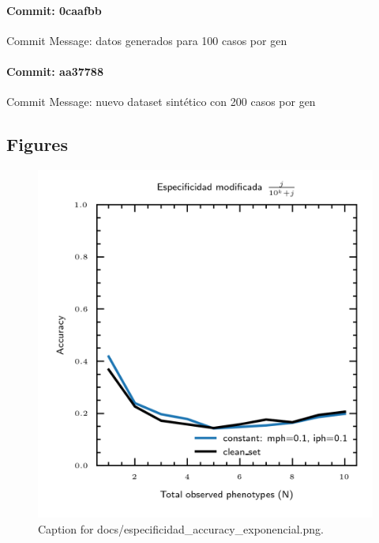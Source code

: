 \documentclass{article}
\begin{document}
\paragraph{Commit: 0caafbb}
Commit Message: datos generados para 100 casos por gen

\paragraph{Commit: aa37788}
Commit Message: nuevo dataset sintético con 200 casos por gen

\subsection{Figures}
\begin{figure}[h] \centering \includegraphics{docs/especificidad_accuracy_exponencial.png} \caption{Caption for docs/especificidad_accuracy_exponencial.png.} \end{figure}
\end{document}
